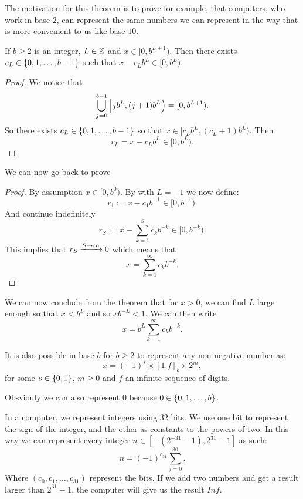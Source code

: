 \documentclass[11pt,a4paper]{article}
\begin{document}
The motivation for this theorem is to prove for example, that computers,
who work in base $2$, can represent the same numbers we can represent
in the way that is more convenient to us like base $10$.

\begin{lemma}
  \label{lem:bases}
  If $b \geq 2$ is an integer, $L \in \mathbb{Z}$ and $x \in [0,b^{L+1})$.
  Then there exists $c_L \in \set{0,1,\dots,b-1}$ such that
  $x - c_L b^{L} \in [0,b^L)$.
\end{lemma}
\begin{proof}
  We notice that
  \[
    \bigcup_{j=0}^{b-1} \intco{j b^L, (j + 1) b^L} =
    [0, b^{L+1}).
  \]
  So there exists $c_L \in \set{0,1,\dots,b-1}$ so that 
  $x \in [c_L b^L, (c_L + 1) b^L)$.
  Then
  \[
    r_L = x - c_L b^L \in [0,b^L).
  \]
\end{proof}

We can now go back to prove 

\begin{proof}
  By assumption $x \in [0,b^0)$.
  By  with $L = -1$ we now define:
  \[
    r_1 := x - c_1 b^{-1} \in [0,b^{-1}).
  \]
  And continue indefinitely
  \[
    r_S := x - \sum_{k=1}^{S} c_k b^{-k} \in [0,b^{-k}).
  \]
  This implies that $r_S \xrightarrow{S \to \infty} 0$ which means that
  \[
    x = \sum_{k=1}^{\infty} c_k b^{-k}.
  \]
\end{proof}

We can now conclude from the theorem that for $x > 0$, we can find $L$
large enough so that $x < b^L$ and so $x b^{-L} < 1$.
We can then write
\[
  x = b^L \sum_{k=1}^{\infty} c_k b^{-k}.
\]

It is also possible in base-$b$ for $b \geq 2$ to represent any
non-negative number as:
\[
  x = (-1)^s \times [1.f]_b \times 2^m,
\]
for some $s \in \set{0,1}$, $m \geq 0$ and $f$ an infinite sequence
of digits.

\begin{remark}
  Obsviouly we can also represent $0$ because $0 \in \set{0,1,\dots,b}$.
\end{remark}

In a computer, we represent integers using $32$ bits.
We use one bit to represent the sign of the integer,
and the other as constants to the powers of two.
In this way we can represent every integer 
$n \in [- (2^{-31} - 1), 2^{31} - 1]$ as such:
\[
  n = (-1)^{c_31} \sum_{j=0}^{30}.
\]
Where $(c_0,c_1,\dots,c_{31})$ represent the bits.
If we add two numbers and get a result larger than $2^31 - 1$,
the computer will give us the result $Inf$.
\end{document}
